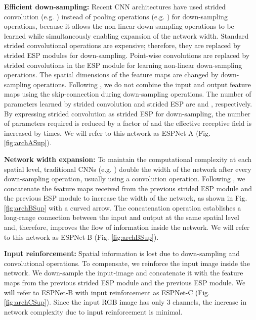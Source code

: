 \documentclass[runningheads]{llncs}
\def\Fig{Fig. }
\begin{document}
\noindent \textbf{Efficient down-sampling:} Recent CNN architectures have used strided convolution (e.g. \cite{springenberg2014striving,he2016deep,xie2017aggregated}) instead of pooling operations (e.g. \cite{simonyan2014very,krizhevsky2012imagenet}) for down-sampling operations, because it allows the non-linear down-sampling operations to be learned while simultaneously enabling expansion of the network width. Standard strided convolutional operations are expensive; therefore, they are replaced by strided ESP modules for down-sampling. Point-wise convolutions are replaced by   strided convolutions in the ESP module for learning non-linear down-sampling operations. The spatial dimensions of the feature maps are changed by down-sampling operations. Following \cite{he2016deep,huang2017densely}, we do not combine the input and output feature maps using the skip-connection during down-sampling operations. The number of parameters learned by strided convolution and strided ESP are  and , respectively. By expressing strided convolution as strided ESP for down-sampling, the number of parameters required is reduced by a factor of  and the effective receptive field is increased by  times. We will refer to this network as ESPNet-A (\Fig \ref{fig:archASup}).

\noindent \textbf{Network width expansion:} To maintain the computational complexity at each spatial level, traditional CNNs (e.g. \cite{simonyan2014very,he2016deep,xie2017aggregated}) double the width of the network after every down-sampling operation, usually using a convolution operation. Following \cite{huang2017densely}, we concatenate the feature maps received from the previous strided ESP module and the previous ESP module to increase the width of the network, as shown in \Fig \ref{fig:archBSup} with a curved arrow. The concatenation operation establishes a long-range connection between the input and output at the same spatial level and, therefore, improves the flow of information inside the network. We will refer to this network as ESPNet-B (\Fig \ref{fig:archBSup}). 

\noindent \textbf{Input reinforcement:} Spatial information is lost due to down-sampling and convolutional operations. To compensate, we reinforce the input image inside the network. We down-sample the input-image and concatenate it with the feature maps from the previous strided ESP module and the previous ESP module. We will refer to ESPNet-B with input reinforcement as ESPNet-C (\Fig \ref{fig:archCSup}). Since the input RGB image has only 3 channels, the increase in network complexity due to input reinforcement is minimal.
\end{document}

